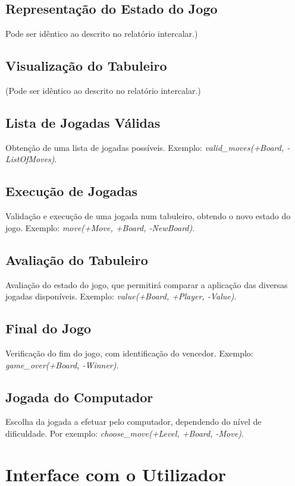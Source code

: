 \documentclass[a4paper]{article}
\begin{document}
\subsection{Representação do Estado do Jogo} Pode ser idêntico ao descrito no relatório intercalar.)

\subsection{Visualização do Tabuleiro} (Pode ser idêntico ao descrito no relatório intercalar.)

\subsection{Lista de Jogadas Válidas} Obtenção de uma lista de jogadas possíveis. Exemplo: \textit{valid\_moves(+Board, -ListOfMoves)}.

\subsection{Execução de Jogadas} Validação e execução de uma jogada num tabuleiro, obtendo o novo estado do jogo. Exemplo: \textit{move(+Move, +Board, -NewBoard)}.

\subsection{Avaliação do Tabuleiro} Avaliação do estado do jogo, que permitirá comparar a aplicação das diversas jogadas disponíveis. Exemplo: \textit{value(+Board, +Player, -Value)}.

\subsection{Final do Jogo} Verificação do fim do jogo, com identificação do vencedor. Exemplo: \textit{game\_over(+Board, -Winner)}.

\subsection{Jogada do Computador} Escolha da jogada a efetuar pelo computador, dependendo do nível de dificuldade. Por exemplo: \textit{choose\_move(+Level, +Board, -Move)}.


\section{Interface com o Utilizador}
\end{document}
